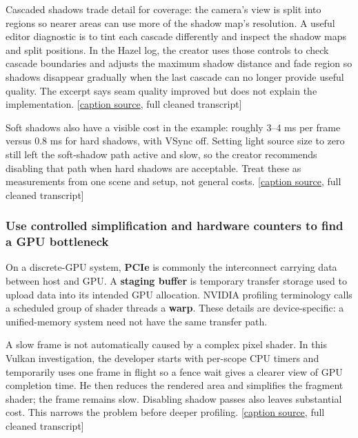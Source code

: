 \hypertarget{06-engine-ii-ch026-inspect-cascades-and-fade-shadows-before-their-quality-runs-out}{}

Cascaded shadows trade detail for coverage: the camera's view is split into regions so nearer areas can use more of the shadow map's resolution. A useful editor diagnostic is to tint each cascade differently and inspect the shadow maps and split positions. In the Hazel log, the creator uses those controls to check cascade boundaries and adjusts the maximum shadow distance and fade region so shadows disappear gradually when the last cascade can no longer provide useful quality. The excerpt says seam quality improved but does not explain the implementation. {[}\href{https://www.youtube.com/watch?v=qbDrqARX07o}{caption source}, full cleaned transcript{]}

Soft shadows also have a visible cost in the example: roughly 3--4 ms per frame versus 0.8 ms for hard shadows, with VSync off. Setting light source size to zero still left the soft-shadow path active and slow, so the creator recommends disabling that path when hard shadows are acceptable. Treat these as measurements from one scene and setup, not general costs. {[}\href{https://www.youtube.com/watch?v=qbDrqARX07o}{caption source}, full cleaned transcript{]}

\subsubsection{Use controlled simplification and hardware counters to find a GPU bottleneck}\label{06-engine-ii-ch026-use-controlled-simplification-and-hardware-counters-to-find-a-gpu-bottleneck}

\hypertarget{06-engine-ii-ch026-use-controlled-simplification-and-hardware-counters-to-find-a-gpu-bottleneck}{}

On a discrete-GPU system, \textbf{PCIe} is commonly the interconnect carrying data between host and GPU. A \textbf{staging buffer} is temporary transfer storage used to upload data into its intended GPU allocation. NVIDIA profiling terminology calls a scheduled group of shader threads a \textbf{warp}. These details are device-specific: a unified-memory system need not have the same transfer path.

A slow frame is not automatically caused by a complex pixel shader. In this Vulkan investigation, the developer starts with per-scope CPU timers and temporarily uses one frame in flight so a fence wait gives a clearer view of GPU completion time. He then reduces the rendered area and simplifies the fragment shader; the frame remains slow. Disabling shadow passes also leaves substantial cost. This narrows the problem before deeper profiling. {[}\href{https://www.youtube.com/watch?v=bUUZ1iD9_e4}{caption source}, full cleaned transcript{]}

